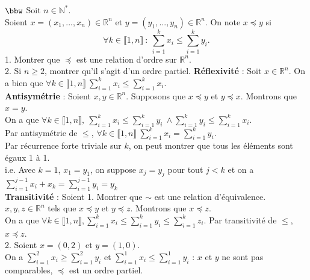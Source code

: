 \documentclass[11pt]{article}
\begin{document}
\begin{exercice}{$\bbw$}{}
    Soit $n\in\mathbb{N}^*$.\\
    Soient $x=(x_1,...,x_n)\in\mathbb{R}^n$ et $y=(y_1,...,y_n)\in\mathbb{R}^n$. On note $x \preceq y$ si
    \begin{equation*}
        \forall k \in \llbracket 1, n \rrbracket ~ : ~ \sum_{i=1}^kx_i \leq \sum_{i=1}^ky_i.
    \end{equation*}
    1. Montrer que $\preceq$ est une relation d'ordre sur $\mathbb{R}^n$.\\
    2. Si $n \geq 2$, montrer qu'il s'agit d'un ordre partiel.
    \tcblower
    \textbf{Réflexivité} : Soit $x\in\mathbb{R}^n$. On a bien que $\forall k \in \llbracket 1,n \rrbracket ~\sum_{i=1}^kx_i \leq \sum_{i=1}^kx_i$.\\[0.1cm]
    \textbf{Antisymétrie} : Soient $x,y\in\mathbb{R}^n$. Supposons que $x \preceq y$ et $y \preceq x$. Montrons que $x=y$.\\
    On a que $\forall k \in \llbracket 1, n \rrbracket, ~ \sum_{i=1}^kx_i \leq \sum_{i=1}^ky_i ~ \wedge \sum_{i=1}^ky_i \leq \sum_{i=1}^kx_i$.\\
    Par antisymétrie de $\leq$, $\forall k \in \llbracket 1, n \rrbracket ~ \sum_{i=1}^kx_i = \sum_{i=1}^k y_i$.\\
    Par récurrence forte triviale sur $k$, on peut montrer que tous les éléments sont égaux 1 à 1.\\
    i.e. Avec $k=1$, $x_1=y_1$, on suppose $x_j = y_j$ pour tout $j<k$ et on a $\sum_{i=1}^{j-1}x_i + x_k = \sum_{i=1}^{j-1}y_i = y_k $\\[0.15cm]
    \textbf{Transitivité} : Soient     1. Montrer que $\sim$ est une relation d'équivalence.\\$x,y,z \in \mathbb{R}^n$ tels que $x \preceq y$ et $y \preceq z$. Montrons que $x \preceq z$.\\
    On a que $\forall k \in \llbracket 1, n \rrbracket, \sum_{i=1}^kx_i \leq \sum_{i=1}^ky_i\leq\sum_{i=1}^kz_i$. Par transitivité de $\leq$, $x \preceq z$.\\[0.2cm]
    2. Soient $x=(0,2)$ et $y=(1,0)$.\\
    On a $\sum_{i=1}^2x_i \geq \sum_{i=1}^2y_i$ et $\sum_{i=1}^1x_i \leq \sum_{i=1}^1y_i$ : $x$ et $y$ ne sont pas comparables, $\preceq$ est un ordre partiel.
\end{exercice}
\end{document}
